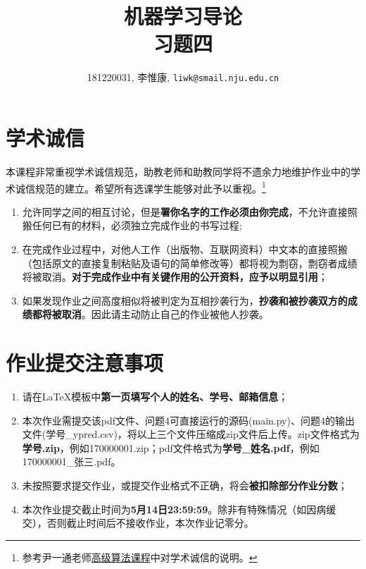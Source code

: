 \documentclass[a4paper,UTF8]{article}
\theoremstyle{definition}
\begin{document}
\title{机器学习导论\\习题四}
\author{181220031, 李惟康, \texttt{liwk@smail.nju.edu.cn}}
\maketitle


\section*{学术诚信}

本课程非常重视学术诚信规范，助教老师和助教同学将不遗余力地维护作业中的学术诚信规范的建立。希望所有选课学生能够对此予以重视。\footnote{参考尹一通老师\href{http://tcs.nju.edu.cn/wiki/}{高级算法课程}中对学术诚信的说明。}

\begin{tcolorbox}
	\begin{enumerate}
		\item[(1)] 允许同学之间的相互讨论，但是{\color{red}\textbf{署你名字的工作必须由你完成}}，不允许直接照搬任何已有的材料，必须独立完成作业的书写过程;
		\item[(2)] 在完成作业过程中，对他人工作（出版物、互联网资料）中文本的直接照搬（包括原文的直接复制粘贴及语句的简单修改等）都将视为剽窃，剽窃者成绩将被取消。{\color{red}\textbf{对于完成作业中有关键作用的公开资料，应予以明显引用}}；
		\item[(3)] 如果发现作业之间高度相似将被判定为互相抄袭行为，{\color{red}\textbf{抄袭和被抄袭双方的成绩都将被取消}}。因此请主动防止自己的作业被他人抄袭。
	\end{enumerate}
\end{tcolorbox}

\section*{作业提交注意事项}
\begin{tcolorbox}
	\begin{enumerate}
		\item[(1)] 请在LaTeX模板中{\color{red}\textbf{第一页填写个人的姓名、学号、邮箱信息}}；
		\item[(2)] 本次作业需提交该pdf文件、问题4可直接运行的源码(main.py)、问题4的输出文件(学号\_ypred.csv)，将以上三个文件压缩成zip文件后上传。zip文件格式为{\color{red}\textbf{学号.zip}}，例如170000001.zip；pdf文件格式为{\color{red}\textbf{学号\_姓名.pdf}}，例如170000001\_张三.pdf。
		\item[(3)] 未按照要求提交作业，或提交作业格式不正确，将会{\color{red}\textbf{被扣除部分作业分数}}；
		\item[(4)] 本次作业提交截止时间为{\color{red}\textbf{5月14日23:59:59}}。除非有特殊情况（如因病缓交），否则截止时间后不接收作业，本次作业记零分。
	\end{enumerate}
\end{tcolorbox}
\end{document}
